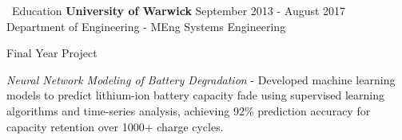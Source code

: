 \documentclass{resume} %
\begin{document}

\begin{rSection}{{\color{sectioncolor}\faGraduationCap}\ Education}
\smallbreak
{\bf University of Warwick} \hfill { September 2013 - August 2017} 
\\ \normalfont Department of Engineering - MEng Systems Engineering  

\begin{rSubsection}{Final Year Project}{}{}{}
\normalfont
\item \textit{Neural Network Modeling of Battery Degradation} - Developed machine learning models to predict lithium-ion battery capacity fade using supervised learning algorithms and time-series analysis, achieving 92\% prediction accuracy for capacity retention over 1000+ charge cycles.
\end{rSubsection}

\end{rSection}

\end{document}
